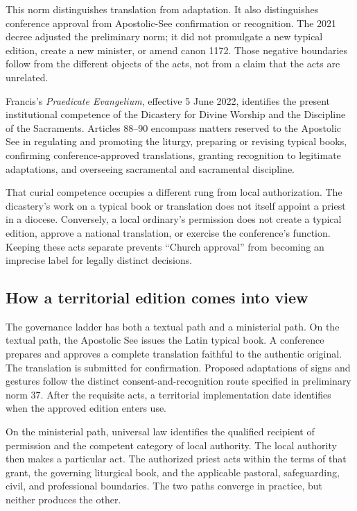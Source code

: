 This norm distinguishes translation from adaptation. It also distinguishes
conference approval from Apostolic-See confirmation or recognition. The 2021
decree adjusted the preliminary norm; it did not promulgate a new typical
edition, create a new minister, or amend canon 1172. Those negative boundaries
follow from the different objects of the acts, not from a claim that the acts
are unrelated.

Francis's \emph{Praedicate Evangelium}, effective 5 June 2022, identifies the
present institutional competence of the Dicastery for Divine Worship and the
Discipline of the Sacraments. Articles 88--90 encompass matters reserved to
the Apostolic See in regulating and promoting the liturgy, preparing or
revising typical books, confirming conference-approved translations, granting
recognition to legitimate adaptations, and overseeing sacramental and
sacramental discipline.

That curial competence occupies a different rung from local authorization.
The dicastery's work on a typical book or translation does not itself appoint
a priest in a diocese. Conversely, a local ordinary's permission does not
create a typical edition, approve a national translation, or exercise the
conference's function. Keeping these acts separate prevents ``Church
approval'' from becoming an imprecise label for legally distinct decisions.

\subsection{How a territorial edition comes into view}

The governance ladder has both a textual path and a ministerial path. On the
textual path, the Apostolic See issues the Latin typical book. A conference
prepares and approves a complete translation faithful to the authentic
original. The translation is submitted for confirmation. Proposed
adaptations of signs and gestures follow the distinct consent-and-recognition
route specified in preliminary norm 37. After the requisite acts, a
territorial implementation date identifies when the approved edition enters
use.

On the ministerial path, universal law identifies the qualified recipient of
permission and the competent category of local authority. The local authority
then makes a particular act. The authorized priest acts within the terms of
that grant, the governing liturgical book, and the applicable pastoral,
safeguarding, civil, and professional boundaries. The two paths converge in
practice, but neither produces the other.

